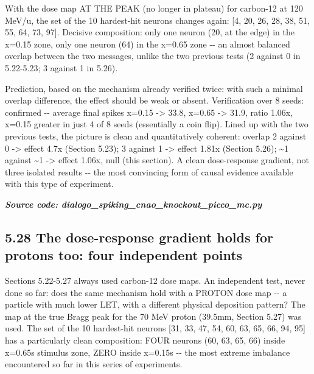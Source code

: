 \documentclass[
  english,
]{article}
\begin{document}
With the dose map AT THE PEAK (no longer in plateau) for carbon-12 at 120 MeV/u, the set of the 10 hardest-hit neurons changes again: {[}4, 20, 26, 28, 38, 51, 55, 64, 73, 97{]}. Decisive composition: only one neuron (20, at the edge) in the x=0.15 zone, only one neuron (64) in the x=0.65 zone -\/- an almost balanced overlap between the two messages, unlike the two previous tests (2 against 0 in 5.22-5.23; 3 against 1 in 5.26).

Prediction, based on the mechanism already verified twice: with such a minimal overlap difference, the effect should be weak or absent. Verification over 8 seeds: confirmed -\/- average final spikes x=0.15 -\textgreater{} 33.8, x=0.65 -\textgreater{} 31.9, ratio 1.06x, x=0.15 greater in just 4 of 8 seeds (essentially a coin flip). Lined up with the two previous tests, the picture is clean and quantitatively coherent: overlap 2 against 0 -\textgreater{} effect 4.7x (Section 5.23); 3 against 1 -\textgreater{} effect 1.81x (Section 5.26); \textasciitilde1 against \textasciitilde1 -\textgreater{} effect 1.06x, null (this section). A clean dose-response gradient, not three isolated results -\/- the most convincing form of causal evidence available with this type of experiment.

\textit{\textbf{Source code: dialogo\_\allowbreak{}spiking\_\allowbreak{}cnao\_\allowbreak{}knockout\_\allowbreak{}picco\_\allowbreak{}mc.py}}


\subsection{5.28 The dose-response gradient holds for protons too: four independent points}\label{the-dose-response-gradient-holds-for-protons-too-four-independent-points}

Sections 5.22-5.27 always used carbon-12 dose maps. An independent test, never done so far: does the same mechanism hold with a PROTON dose map -\/- a particle with much lower LET, with a different physical deposition pattern? The map at the true Bragg peak for the 70 MeV proton (39.5mm, Section 5.27) was used. The set of the 10 hardest-hit neurons {[}31, 33, 47, 54, 60, 63, 65, 66, 94, 95{]} has a particularly clean composition: FOUR neurons (60, 63, 65, 66) inside x=0.65\textquotesingle s stimulus zone, ZERO inside x=0.15\textquotesingle s -\/- the most extreme imbalance encountered so far in this series of experiments.
\end{document}
